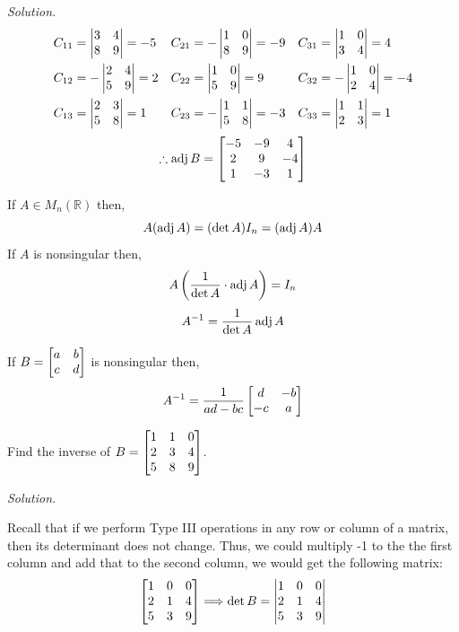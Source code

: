 \textit{Solution.} \label{example:4.6}
\begin{align*}
C_{11} &= \begin{vmatrix} 3 & 4 \\ 8 & 9 \end{vmatrix} = -5 & C_{21} &= -\begin{vmatrix} 1 & 0 \\ 8 & 9 \end{vmatrix} = -9 & C_{31} &= \begin{vmatrix} 1 & 0 \\ 3 & 4 \end{vmatrix} = 4 \\
C_{12} &= -\begin{vmatrix} 2 & 4 \\ 5 & 9 \end{vmatrix} = 2 & C_{22} &= \begin{vmatrix} 1 & 0 \\ 5 & 9 \end{vmatrix} = 9  & C_{32} &= -\begin{vmatrix} 1 & 0 \\ 2 & 4 \end{vmatrix} = -4 \\
C_{13} &= \begin{vmatrix} 2 & 3 \\ 5 & 8 \end{vmatrix} = 1  & C_{23} &= -\begin{vmatrix} 1 & 1 \\ 5 & 8 \end{vmatrix} = -3 & C_{33} &= \begin{vmatrix} 1 & 1 \\ 2 & 3 \end{vmatrix} = 1
\end{align*}
$$\therefore \operatorname{adj} B = \begin{bmatrix} -5 & -9 & 4 \\ 2 & 9 & -4 \\ 1 & -3 & 1 \end{bmatrix}$$

\begin{theorem}
If $A \in M_n(\mathbb{R})$ then,
$$A(\operatorname{adj} A) = (\det A)I_n = (\operatorname{adj} A)A$$
If $A$ is nonsingular then,
$$A\left(\frac{1}{\det A} \cdot \operatorname{adj} A\right) = I_n$$
$$A^{-1} = \frac{1}{\det A} \operatorname{adj} A$$
\end{theorem}

\begin{example}
If $\displaystyle B = \begin{bmatrix} 
a & b \\
c & d
 \end{bmatrix}$ is nonsingular then,
$$A^{-1} = \frac{1}{ad - bc}\begin{bmatrix} d & -b \\ -c & a \end{bmatrix}$$
\end{example}

\begin{example}
Find the inverse of $\displaystyle B = \begin{bmatrix} 1 & 1 & 0 \\ 2 & 3 & 4 \\ 5 & 8 & 9 \end{bmatrix}$.
\end{example}

\textit{Solution.}

Recall that if we perform Type III operations in any row or column of a matrix, then its determinant does not change. Thus, we could multiply -1 to the the first column and add that to the second column, we would get the following matrix:
$$\begin{bmatrix} 1 & 0 & 0 \\ 2 &1 & 4 \\ 5 & 3 & 9 \end{bmatrix} \Longrightarrow \det B = \begin{vmatrix} 1 & 0 & 0 \\ 2 & 1 & 4 \\ 5 & 3 & 9 \end{vmatrix}$$

